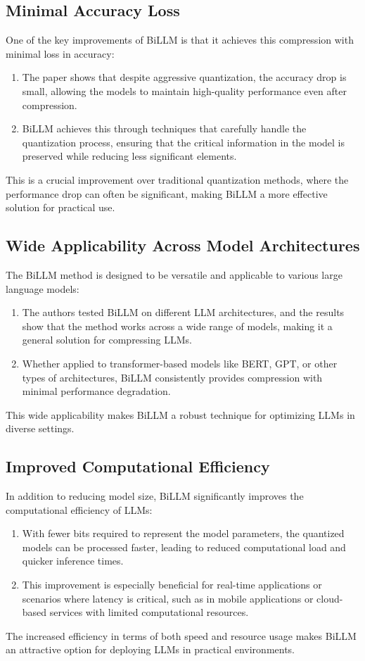 \documentclass{report}
\begin{document}
	\subsection{Minimal Accuracy Loss}
	One of the key improvements of BiLLM is that it achieves this compression with minimal loss in accuracy:
	
	\begin{enumerate}
		\item 
		The paper shows that despite aggressive quantization, the accuracy drop is small, allowing the models to maintain high-quality performance even after compression.
		
		\item 
		BiLLM achieves this through techniques that carefully handle the quantization process, ensuring that the critical information in the model is preserved while reducing less significant elements.
	\end{enumerate}
	This is a crucial improvement over traditional quantization methods, where the performance drop can often be significant, making BiLLM a more effective solution for practical use.
	
	
	\subsection{Wide Applicability Across Model Architectures}
	The BiLLM method is designed to be versatile and applicable to various large language models:
	\begin{enumerate}
		\item 
		The authors tested BiLLM on different LLM architectures, and the results show that the method works across a wide range of models, making it a general solution for compressing LLMs.
		
		\item 
		Whether applied to transformer-based models like BERT, GPT, or other types of architectures, BiLLM consistently provides compression with minimal performance degradation.
	\end{enumerate}
	This wide applicability makes BiLLM a robust technique for optimizing LLMs in diverse settings.
	
	
	\subsection{Improved Computational Efficiency}
	In addition to reducing model size, BiLLM significantly improves the computational efficiency of LLMs:
	\begin{enumerate}
		\item 
		With fewer bits required to represent the model parameters, the quantized models can be processed faster, leading to reduced computational load and quicker inference times.
		
		\item 
		This improvement is especially beneficial for real-time applications or scenarios where latency is critical, such as in mobile applications or cloud-based services with limited computational resources.
	\end{enumerate}
	The increased efficiency in terms of both speed and resource usage makes BiLLM an attractive option for deploying LLMs in practical environments.
	
\end{document}
